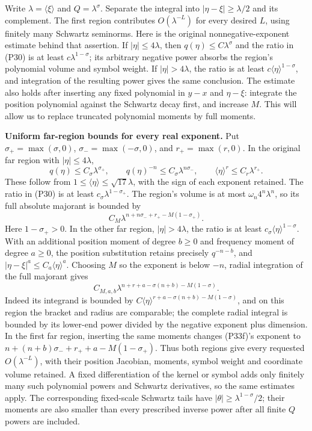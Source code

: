 \documentclass[
  11pt,
]{article}
\begin{document}
Write \(\lambda=\langle\xi\rangle\) and \(Q=\lambda^\sigma\). Separate
the integral into \(|\eta-\xi|\geq\lambda/2\) and its complement. The
first region contributes \(O(\lambda^{-L})\) for every desired \(L\),
using finitely many Schwartz seminorms. Here is the original
nonnegative-exponent estimate behind that assertion. If
\(|\eta|\leq4\lambda\), then \(q(\eta)\leq C\lambda^\sigma\) and the
ratio in (P30) is at least \(c\lambda^{1-\sigma}\); its arbitrary
negative power absorbs the region's polynomial volume and symbol weight.
If \(|\eta|>4\lambda\), the ratio is at least
\(c\langle\eta\rangle^{1-\sigma}\), and integration of the resulting
power gives the same conclusion. The estimate also holds after inserting
any fixed polynomial in \(y-x\) and \(\eta-\xi\): integrate the position
polynomial against the Schwartz decay first, and increase \(M\). This
will allow us to replace truncated polynomial moments by full moments.

\textbf{Uniform far-region bounds for every real exponent.} Put
\(\sigma_+=\max(\sigma,0)\), \(\sigma_-=\max(-\sigma,0)\), and
\(r_+=\max(r,0)\). In the original far region with
\(|\eta|\leq4\lambda\), \[
 q(\eta)\leq C_\sigma\lambda^{\sigma_+},\qquad
 q(\eta)^{-n}\leq C_\sigma\lambda^{n\sigma_-},\qquad
 \langle\eta\rangle^r\leq C_r\lambda^{r_+}.
 \tag{P33e}
\] These follow from \(1\leq\langle\eta\rangle\leq\sqrt{17}\lambda\),
with the sign of each exponent retained. The ratio in (P30) is at least
\(c_\sigma\lambda^{1-\sigma_+}\). The region's volume is at most
\(\omega_n4^n\lambda^n\), so its full absolute majorant is bounded by \[
 C_M\lambda^{n+n\sigma_-+r_+-M(1-\sigma_+)}.
 \tag{P33f}
\] Here \(1-\sigma_+>0\). In the other far region, \(|\eta|>4\lambda\),
the ratio is at least \(c_\sigma\langle\eta\rangle^{1-\sigma}\). With an
additional position moment of degree \(b\geq0\) and frequency moment of
degree \(a\geq0\), the position substitution retains precisely
\(q^{-n-b}\), and \(|\eta-\xi|^a\leq C_a\langle\eta\rangle^a\). Choosing
\(M\) so the exponent is below \(-n\), radial integration of the full
majorant gives \[
 C_{M,a,b}\lambda^{n+r+a-\sigma(n+b)-M(1-\sigma)}.
 \tag{P33g}
\] Indeed its integrand is bounded by
\(C\langle\eta\rangle^{r+a-\sigma(n+b)-M(1-\sigma)}\), and on this
region the bracket and radius are comparable; the complete radial
integral is bounded by its lower-end power divided by the negative
exponent plus dimension. In the first far region, inserting the same
moments changes (P33f)'s exponent to
\(n+(n+b)\sigma_-+r_++a-M(1-\sigma_+)\). Thus both regions give every
requested \(O(\lambda^{-L})\), with their position Jacobian, moments,
symbol weight and coordinate volume retained. A fixed differentiation of
the kernel or symbol adds only finitely many such polynomial powers and
Schwartz derivatives, so the same estimates apply. The corresponding
fixed-scale Schwartz tails have \(|\theta|\geq\lambda^{1-\sigma}/2\);
their moments are also smaller than every prescribed inverse power after
all finite \(Q\) powers are included.
\end{document}
